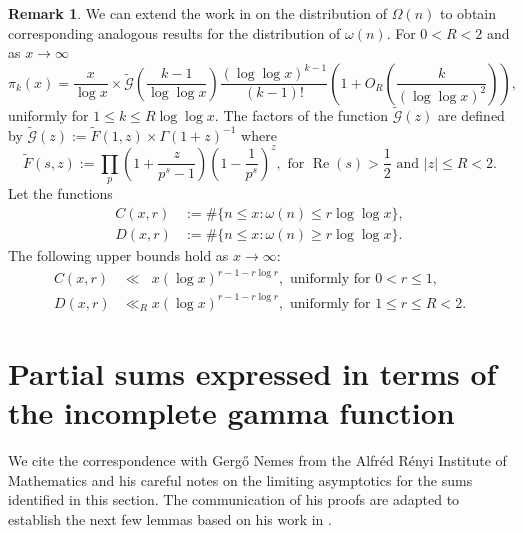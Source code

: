 \documentclass[11pt,reqno,a4letter]{article}
\numberwithin{equation}{section}
\numberwithin{figure}{section}
\numberwithin{table}{section}
\theoremstyle{plain}
\numberwithin{theorem}{section}
\theoremstyle{definition}
\newtheorem{remark}[theorem]{Remark}
\renewcommand{\Re}{\operatorname{Re}}
\begin{document}
\begin{remark} 
\label{remark_MV_Pikx_FuncResultsAnnotated_v1} 
We can extend the work in \cite{MV} on the distribution of $\Omega(n)$ to obtain 
corresponding analogous results for the distribution of $\omega(n)$. 
For $0 < R < 2$ and as $x \rightarrow \infty$ 
\begin{equation}
\label{eqn_Pikx_UniformAsymptoticsStmt_from_MV_v2} 
\pi_k(x) = \frac{x}{\log x} \times 
     \widetilde{\mathcal{G}}\left(\frac{k-1}{\log\log x}\right) 
     \frac{(\log\log x)^{k-1}}{(k-1)!} \left( 
     1 + O_R\left(\frac{k}{(\log\log x)^2}\right) 
     \right), 
\end{equation}
uniformly for $1 \leq k \leq R\log\log x$. 
The factors of the function $\widetilde{\mathcal{G}}(z)$ are 
defined by $\widetilde{\mathcal{G}}(z) := \widetilde{F}(1, z) \times \Gamma(1+z)^{-1}$ where 
\[
\widetilde{F}(s, z) := \prod_p \left(1 + \frac{z}{p^s-1}\right) \left(1 - \frac{1}{p^s}\right)^{z}, 
	\text{ for } \Re(s) > \frac{1}{2} \text{ and } |z| \leq R < 2. 
\]
Let the functions 
\begin{align*} 
C(x, r) & := \#\{n \leq x: \omega(n) \leq r \log\log x\}, \\ 
D(x, r) & := \#\{n \leq x: \omega(n) \geq r \log\log x\}. 
\end{align*} 
The following upper bounds hold as $x \rightarrow \infty$: 
\begin{align*} 
C(x, r) & \ll\phantom{_R} x (\log x)^{r - 1 - r \log r}, \text{ uniformly for } 0 < r \leq 1, \\ 
D(x, r) & \ll_R x (\log x)^{r - 1 - r \log r}, \text{ uniformly for } 1 \leq r \leq R < 2.
\end{align*} 
\end{remark} 

\section{Partial sums expressed in terms of the incomplete gamma function} 
\label{subSection_OtherFactsAndResults} 

We cite the correspondence with Gerg\H{o} Nemes 
from the Alfr\'{e}d R\'{e}nyi Institute of Mathematics and his 
careful notes on the limiting asymptotics for the sums identified in this section. 
The communication of his proofs are adapted to establish the next few lemmas based on 
his work in \cite{NEMES2015C,NEMES2016,NEMES2019}. 
\end{document}

